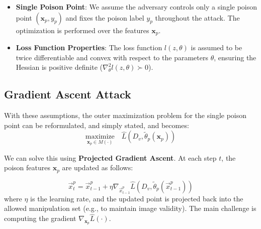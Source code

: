 \documentclass[11pt]{report}
\begin{document}
\begin{itemize}
    \item \textbf{Single Poison Point}: We assume the adversary controls only a single poison point $(\bm{x}_p, y_p)$ and fixes the poison label $y_p$ throughout the attack. The optimization is performed over the features $\bm{x}_p$.
    \item \textbf{Loss Function Properties}: The loss function $l(z, \theta)$ is assumed to be twice differentiable and convex with respect to the parameters $\theta$, ensuring the Hessian is positive definite ($\nabla^2_{\theta} l(z, \theta) \succ 0$).
\end{itemize}



\subsection{Gradient Ascent Attack}
With these assumptions, the outer maximization problem for the single poison point can be reformulated, and simply stated, and becomes:
\begin{equation}
    \underset{\bm{x}_p \in M(\cdot)}{\text{maximize}} \quad \hat{L}(D_v, \tilde{\theta}_p(\bm{x}_p))
\end{equation}

We can solve this using \textbf{Projected Gradient Ascent}. At each step $t$, the poison features $\bm{x}_p$ are updated as follows:

\begin{equation}
    \vec{x}_t^p = \vec{x}_{t-1}^p + \eta \nabla_{\vec{x}_{t-1}^p} \hat{L}(D_v, \tilde{\theta}_p(\vec{x}_{t-1}^p))
\end{equation}
where $\eta$ is the learning rate, and the updated point is projected back into the allowed manipulation set (e.g., to maintain image validity). The main challenge is computing the gradient $\nabla_{\bm{x}_p} \hat{L}(\cdot)$.


\end{document}
